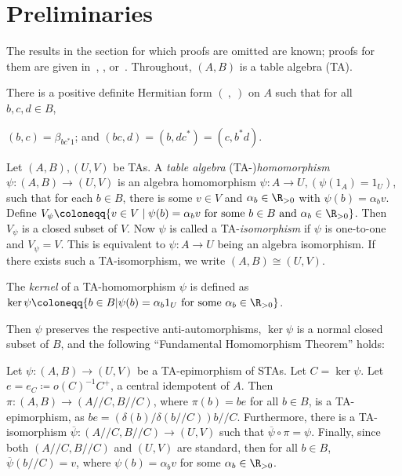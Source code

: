 \section{Preliminaries}\label{sect2}
The results in the section for which proofs are omitted are known;
proofs for them are given 
in~\cite{AFM}, \cite{BZ}, or~\cite{Blau2}. Throughout,
$(A, B)$ is a table algebra (TA).



There is a positive definite Hermitian form $(\ ,\ )$ on $A$ such that
for
all $b,c,d \in B$,
\begin{center}
$(b,c) = \beta_{bc^*1}$; and
$(bc,d) = (b,dc^*) = (c,b^*d)$.
\end{center}

\begin{defi}
\label{def:TA-hom}
Let $(A, B), (U, V)$ be TAs. A \emph{table algebra} 
\textup{(}TA-\textup{)}\emph{homomorphism} 
$\psi: (A, B) \rightarrow (U, V)$ 
is an algebra homomorphism $\psi: A \rightarrow U, (\psi (1_A) = 1_U)$,
such that for each $b \in B$, there is some $v \in V$ and $\alpha_{b}
\in \R_{>0}$ with
$ \psi(b) = \alpha_{b}v$.
Define
$V_{\psi} \coloneqq \{ v \in V \mid \psi(b) = \alpha_bv \mbox{ for some }b \in
B \mbox{ and } \alpha_b \in \R_{>0}\}$. Then $V_{\psi}$ is a closed
subset of $V$. 
Now $\psi$ is called a TA-\emph{isomorphism} if $\psi$ is one-to-one
and $V_{\psi} = V$. This is equivalent to $\psi: A \rightarrow U$
being an algebra isomorphism. If there exists such a TA-isomorphism, 
we 
write $(A, B) \cong (U, V)$.
\end{defi}

\begin{defi}
\label{def:kernel}
The \emph{kernel} of a TA-homomorphism $\psi$ is defined as
$\ker \psi \coloneqq \{b \in B \vert \psi(b) = \alpha_b1_U \mbox{ for some
}\alpha_b \in \R_{>0}\}$.
\end{defi}

Then $\psi$ preserves the respective anti-automorphisms, $\ker \psi$ is a normal closed subset of $B$, and the
following ``Fundamental Homomorphism Theorem'' holds:
 

\begin{prop}
\label{prop:FHT}
Let $\psi : (A, B) \rightarrow (U, V)$ be a TA-epimorphism of STAs. Let
$C = \ker \psi$. Let $e = e_C \coloneqq o(C)^{-1}C^+$, a central
idempotent of $A$. Then $\pi : (A, B) \rightarrow (A//C, B//C)$, where
$\pi(b) = be$ for all $b \in B$, is a TA-epimorphism, as $be =
(\delta(b)/\delta(b//C))b//C$. Furthermore, there is a TA-isomorphism
$\overline{\psi} : (A//C, B//C) \rightarrow (U, V)$ such that
$\overline{\psi}\circ \pi = \psi$. Finally, since both $(A//C, B//C)$
and $(U, V)$ are standard, then for all $b \in B$,
$\overline{\psi}(b//C) = v$, where $\psi(b) = \alpha_bv$ for some
$\alpha_b \in {\R}_{>0}$. 
\end{prop} 


